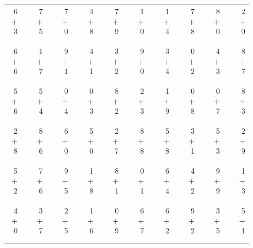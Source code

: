 \documentclass[12pt, letterpaper]{article}
\begin{document}
\begin{tabular}{rrrrrrrrrrrrrrrrrrr}
6 & & 7 & & 7 & & 4 & & 7 & & 1 & & 1 & & 7 & & 8 & & 2\\
$+$ 3 & & $+$ 5 & & $+$ 0 & & $+$ 8 & & $+$ 9 & & $+$ 0 & & $+$ 4 & & $+$ 8 & & $+$ 0 & & $+$ 0\\
\cline{1-1} \cline{3-3} \cline{5-5} \cline{7-7} \cline{9-9} \cline{11-11} \cline{13-13} \cline{15-15} \cline{17-17} \cline{19-19} \\ \\
6 & & 1 & & 9 & & 4 & & 3 & & 9 & & 3 & & 0 & & 4 & & 8\\
$+$ 6 & & $+$ 7 & & $+$ 1 & & $+$ 1 & & $+$ 2 & & $+$ 0 & & $+$ 4 & & $+$ 2 & & $+$ 3 & & $+$ 7\\
\cline{1-1} \cline{3-3} \cline{5-5} \cline{7-7} \cline{9-9} \cline{11-11} \cline{13-13} \cline{15-15} \cline{17-17} \cline{19-19} \\ \\
5 & & 5 & & 0 & & 0 & & 8 & & 2 & & 1 & & 0 & & 0 & & 8\\
$+$ 6 & & $+$ 4 & & $+$ 4 & & $+$ 3 & & $+$ 2 & & $+$ 3 & & $+$ 9 & & $+$ 8 & & $+$ 7 & & $+$ 3\\
\cline{1-1} \cline{3-3} \cline{5-5} \cline{7-7} \cline{9-9} \cline{11-11} \cline{13-13} \cline{15-15} \cline{17-17} \cline{19-19} \\ \\
2 & & 8 & & 6 & & 5 & & 2 & & 8 & & 5 & & 3 & & 5 & & 2\\
$+$ 8 & & $+$ 6 & & $+$ 0 & & $+$ 0 & & $+$ 7 & & $+$ 8 & & $+$ 8 & & $+$ 1 & & $+$ 3 & & $+$ 9\\
\cline{1-1} \cline{3-3} \cline{5-5} \cline{7-7} \cline{9-9} \cline{11-11} \cline{13-13} \cline{15-15} \cline{17-17} \cline{19-19} \\ \\
5 & & 7 & & 9 & & 1 & & 8 & & 0 & & 6 & & 4 & & 9 & & 1\\
$+$ 2 & & $+$ 6 & & $+$ 5 & & $+$ 8 & & $+$ 1 & & $+$ 1 & & $+$ 4 & & $+$ 2 & & $+$ 9 & & $+$ 3\\
\cline{1-1} \cline{3-3} \cline{5-5} \cline{7-7} \cline{9-9} \cline{11-11} \cline{13-13} \cline{15-15} \cline{17-17} \cline{19-19} \\ \\
4 & & 3 & & 2 & & 1 & & 0 & & 6 & & 6 & & 9 & & 3 & & 5\\
$+$ 0 & & $+$ 7 & & $+$ 5 & & $+$ 6 & & $+$ 9 & & $+$ 7 & & $+$ 2 & & $+$ 2 & & $+$ 5 & & $+$ 1\\
\cline{1-1} \cline{3-3} \cline{5-5} \cline{7-7} \cline{9-9} \cline{11-11} \cline{13-13} \cline{15-15} \cline{17-17} \cline{19-19} \\ \\

\end{tabular}
\end{document}
